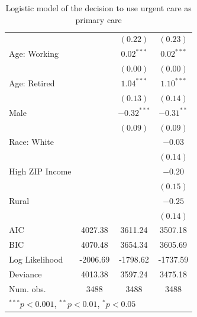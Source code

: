 \documentclass[12pt,twoside]{reedthesis}
\begin{document}
\begin{table}
\begin{center}
\begin{small}
\begin{tabular}{l c c c }
                                &               & $(0.22)$      & $(0.23)$      \\
  Age: Working                  &               & $0.02^{***}$  & $0.02^{***}$  \\
                                &               & $(0.00)$      & $(0.00)$      \\
  Age: Retired                  &               & $1.04^{***}$  & $1.10^{***}$  \\
                                &               & $(0.13)$      & $(0.14)$      \\
  Male                          &               & $-0.32^{***}$ & $-0.31^{**}$  \\
                                &               & $(0.09)$      & $(0.09)$      \\
  Race: White                   &               &               & $-0.03$       \\
                                &               &               & $(0.14)$      \\
  High ZIP Income               &               &               & $-0.20$       \\
                                &               &               & $(0.15)$      \\
  Rural                         &               &               & $-0.25$       \\
                                &               &               & $(0.14)$      \\
  \hline
  AIC                           & 4027.38       & 3611.24       & 3507.18       \\
  BIC                           & 4070.48       & 3654.34       & 3605.69       \\
  Log Likelihood                & -2006.69      & -1798.62      & -1737.59      \\
  Deviance                      & 4013.38       & 3597.24       & 3475.18       \\
  Num. obs.                     & 3488          & 3488          & 3488          \\
  \hline
  \multicolumn{4}{l}{\tiny{$^{***}p<0.001$, $^{**}p<0.01$, $^*p<0.05$}}
  \end{tabular}
  \end{small}
  \caption{Logistic model of the decision to use urgent care as primary care}
  \label{table:coefficients}
  \end{center}
  \end{table}
  
\end{document}

